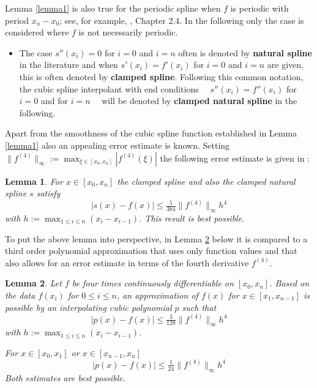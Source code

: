 \documentclass[12pt]{article}
\newtheorem{lemma}{Lemma}
\begin{document}
Lemma \ref{lemma1} is also true for 
the periodic spline when $f$ is periodic with period $x_n\!-\!x_0$; 
see, for example, \cite{Stoer}, Chapter 2.4.
In the following only the case is considered where $f$
is not necessarily periodic.

\begin{itemize}
  \item
The case $s''(x_i)=0$ for $i=0$ and $i=n$ often is denoted
by {\bf natural spline} in the literature and when
$s'(x_i)=f'(x_i)$ for $i=0$ and $i=n$ are given, this is
often denoted by {\bf clamped spline}. Following this common notation,
the %
cubic spline interpolant %
with end conditions \ \ 
$s''(x_i)=f''(x_i)$ for $i=0$ and for $i=n$ \ \ 
will be denoted by
{\bf clamped natural spline} in the following.
\end{itemize}

Apart from the smoothness of the cubic spline function
established in Lemma \ref{lemma1} also an appealing
error estimate is known.
Setting $\|f^{(4)}\|_\infty:=\max_{\xi\in[x_0,x_n]}|f^{(4)}(\xi)|$
the following error estimate is given in \cite{HallMeyer}:

\begin{lemma}\label{5384}
  For $x\in[x_0,x_n]$ the clamped spline
  and also the clamped natural spline $s$ satisfy
  $$
  |s(x)-f(x)|\le \tfrac{5}{384}\|f^{(4)}\|_\infty h^4
  $$
  with $h:=\max_{1\le i\le n}(x_i-x_{i-1})$. This result is best possible.
\end{lemma}

To put the above lemma into perspective, in Lemma \ref{3128}
below it is compared to a third order
polynomial approximation that uses only function values
and that also allows for an error estimate in terms of
the fourth derivative $f^{(4)}$.


\begin{lemma}\label{3128}
  Let $f$ be four times continuously differentiable on $[x_0,x_n]$.
  Based on the data $f(x_i)$ for $0\le i\le n$,
  an approximation of $f(x)$ for $x\in[x_1,x_{n-1}]$ is possible
  by an interpolating cubic polynomial $p$ such that 
  $$
  |p(x)-f(x)|\le \tfrac{3}{128}\|f^{(4)}\|_\infty h^4
  $$
  with $h:=\max_{1\le i\le n}(x_i-x_{i-1})$.
  
  For $x\in[x_0,x_1]$ or $x\in[x_{n-1},x_n]$ 
  $$
  |p(x)-f(x)|\le \tfrac{1}{24}\|f^{(4)}\|_\infty h^4
  $$
  Both estimates are  best possible.
\end{lemma}
\end{document}
